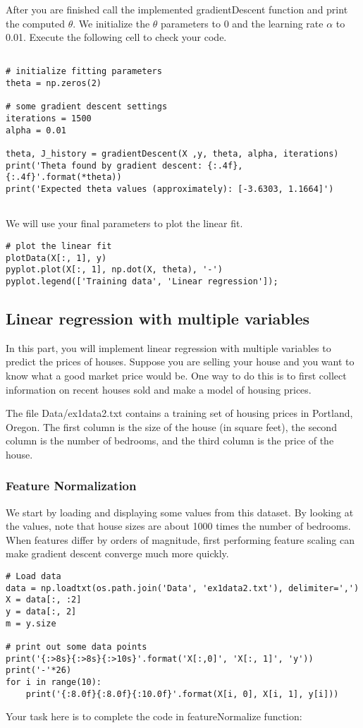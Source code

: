 \documentclass[11pt]{article}
\begin{document}
After you are finished call the implemented gradientDescent function and print the computed \(\theta\). We initialize the \(\theta\) parameters to 0 and the learning rate \(\alpha\) to 0.01. Execute the following cell to check your code.
\begin{verbatim}

# initialize fitting parameters
theta = np.zeros(2)

# some gradient descent settings
iterations = 1500
alpha = 0.01

theta, J_history = gradientDescent(X ,y, theta, alpha, iterations)
print('Theta found by gradient descent: {:.4f}, {:.4f}'.format(*theta))
print('Expected theta values (approximately): [-3.6303, 1.1664]')


\end{verbatim}
We will use your final parameters to plot the linear fit.
\begin{verbatim}
# plot the linear fit
plotData(X[:, 1], y)
pyplot.plot(X[:, 1], np.dot(X, theta), '-')
pyplot.legend(['Training data', 'Linear regression']);
\end{verbatim}
\subsection{Linear regression with multiple variables}
\label{sec:org4b671dc}
In this part, you will implement linear regression with multiple variables to predict the prices of houses. Suppose you are selling your house and you want to know what a good market price would be. One way to do this is to first collect information on recent houses sold and make a model of housing prices.

The file Data/ex1data2.txt contains a training set of housing prices in Portland, Oregon. The first column is the size of the house (in square feet), the second column is the number of bedrooms, and the third column is the price of the house.


\subsubsection{Feature Normalization}
\label{sec:org6f0a7df}
We start by loading and displaying some values from this dataset. By looking at the values, note that house sizes are about 1000 times the number of bedrooms. When features differ by orders of magnitude, first performing feature scaling can make gradient descent converge much more quickly.

\begin{verbatim}
# Load data
data = np.loadtxt(os.path.join('Data', 'ex1data2.txt'), delimiter=',')
X = data[:, :2]
y = data[:, 2]
m = y.size

# print out some data points
print('{:>8s}{:>8s}{:>10s}'.format('X[:,0]', 'X[:, 1]', 'y'))
print('-'*26)
for i in range(10):
    print('{:8.0f}{:8.0f}{:10.0f}'.format(X[i, 0], X[i, 1], y[i]))
\end{verbatim}
Your task here is to complete the code in featureNormalize function:
\end{document}
